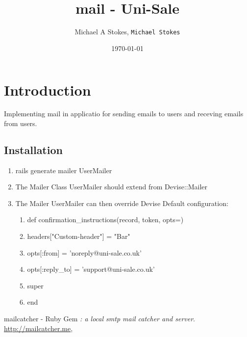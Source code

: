 \documentclass[11pt]{article}
\title{mail - Uni-Sale}
\author{Michael A Stokes, \texttt{Michael Stokes}}
\date{\today}
\begin{document}
\maketitle

\section{Introduction}
Implementing mail in applicatio for sending emails to users and receving
emails from users.


\subsection{Installation}

\begin{enumerate}
\item rails generate mailer UserMailer
\item The Mailer Class UserMailer should extend from Devise::Mailer
\item The Mailer UserMailer can then override Devise Default configuration:
  \begin{enumerate}
    \item def confirmation_instructions(record, token, opts={})
    \item headers["Custom-header"] = "Bar"
    \item opts[:from] = 'noreply@uni-sale.co.uk'
    \item opts[:reply_to] = 'support@uni-sale.co.uk'
    \item super
    \item end
  \end{enumerate}
\end{enumerate}

\begin{thebibliography}{9}

  mailcatcher - Ruby Gem
  \emph{: a local smtp mail catcher and server}.
  {\url{http://mailcatcher.me}},
\end{thebibliography}
\end{document}
